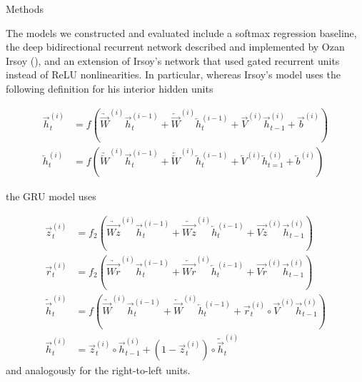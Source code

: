 \documentclass[final]{beamer}
\newlength{\twocolwid}
\begin{document}
\begin{frame}[t]
\begin{columns}[t]
\begin{column}{\twocolwid}
\begin{column}{\twocolwid}
\begin{block}{Methods}

The models we constructed and evaluated include a softmax regression baseline, the deep bidirectional recurrent network described and implemented by Ozan Irsoy (\cite{irsoy2014opinion}), and an extension of Irsoy's network that used gated recurrent units instead of ReLU nonlinearities. In particular, whereas Irsoy's model uses the following definition for his interior hidden units

\begin{framed}
\begin{align}
  \overrightarrow{h}_t^{(i)} &= f(\underrightarrow{\overrightarrow{W}}^{(i)} \overrightarrow{h}_t^{(i-1)} + \underleftarrow{\overrightarrow{W}}^{(i)} \overleftarrow{h}_t^{(i-1)} + \overrightarrow{V}^{(i)} \overrightarrow{h}_{t-1}^{(i)} + \overrightarrow{b}^{(i)}) \\
  \overleftarrow{h}_t^{(i)} &= f(\underrightarrow{\overleftarrow{W}}^{(i)} \overrightarrow{h}_t^{(i-1)} + \underleftarrow{\overleftarrow{W}}^{(i)} \overleftarrow{h}_t^{(i-1)} + \overleftarrow{V}^{(i)} \overleftarrow{h}_{t=1}^{(i)} + \overleftarrow{b}^{(i)})
\end{align}
\end{framed}

the GRU model uses

\begin{framed}
\begin{align}
  \overrightarrow{z}_t^{(i)} &= f_2(\underrightarrow{\overrightarrow{Wz}}^{(i)} \overrightarrow{h}_t^{(i-1)} + \underleftarrow{\overrightarrow{Wz}}^{(i)} \overleftarrow{h}_t^{(i-1)} + \overrightarrow{Vz}^{(i)} \overrightarrow{h}_{t-1}^{(i)}) \\
  \overrightarrow{r}_t^{(i)} &= f_2(\underrightarrow{\overrightarrow{Wr}}^{(i)} \overrightarrow{h}_t^{(i-1)} + \underleftarrow{\overrightarrow{Wr}}^{(i)} \overleftarrow{h}_t^{(i-1)} + \overrightarrow{Vr}^{(i)} \overrightarrow{h}_{t-1}^{(i)}) \\
  \widetilde{\overrightarrow{h}}_t^{(i)} &= f(\underrightarrow{\overrightarrow{W}}^{(i)} \overrightarrow{h}_t^{(i-1)} + \underleftarrow{\overrightarrow{W}}^{(i)} \overleftarrow{h}_t^{(i-1)} + \overrightarrow{r}_t^{(i)} \circ \overrightarrow{V}^{(i)} \overrightarrow{h}_{t-1}^{(i)}) \\
  \overrightarrow{h}_t^{(i)} &= \overrightarrow{z}_t^{(i)} \circ \overrightarrow{h}_{t-1}^{(i)} + (1 - \overrightarrow{z}_t^{(i)}) \circ \widetilde{\overrightarrow{h}}_t^{(i)}
\end{align}
and analogously for the right-to-left units.
\end{framed}


\end{block}
\end{column}
\end{column}
\end{columns}
\end{frame}
\end{document}
